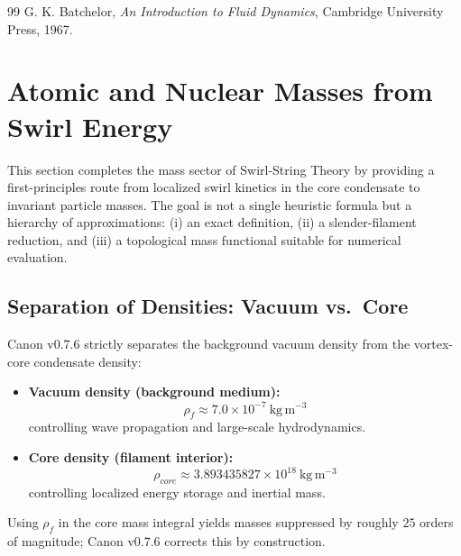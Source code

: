 \documentclass[10pt]{article}
\newcommand{\rhof}{\rho_{\!f}}                           %
\newcommand{\rhocore}{\rho_{core}}
\begin{document}
        \begin{thebibliography}{99}
            G. K. Batchelor,
            \textit{An Introduction to Fluid Dynamics},
            Cambridge University Press, 1967.
        \end{thebibliography}
        
    \section{Atomic and Nuclear Masses from Swirl Energy}
    \label{sec:mass_expanded}

    This section completes the mass sector of Swirl-String Theory by providing a
    first-principles route from localized swirl kinetics in the core condensate to
    invariant particle masses. The goal is not a single heuristic formula but a
    hierarchy of approximations: (i) an exact definition, (ii) a slender-filament
    reduction, and (iii) a topological mass functional suitable for numerical
    evaluation.

    \subsection{Separation of Densities: Vacuum vs.\ Core}

        Canon v0.7.6 strictly separates the background vacuum density from the vortex-core
        condensate density:

        \begin{itemize}
            \item \textbf{Vacuum density (background medium):}
            \[
                \rhof \approx 7.0\times 10^{-7}\ \mathrm{kg\,m^{-3}}
            \]
            controlling wave propagation and large-scale hydrodynamics.
            \item \textbf{Core density (filament interior):}
            \[
                \rhocore \approx 3.893435827\times 10^{18}\ \mathrm{kg\,m^{-3}}
            \]
            controlling localized energy storage and inertial mass.
        \end{itemize}

        Using $\rhof$ in the core mass integral yields masses suppressed by roughly
        $25$ orders of magnitude; Canon v0.7.6 corrects this by construction.
\end{document}
